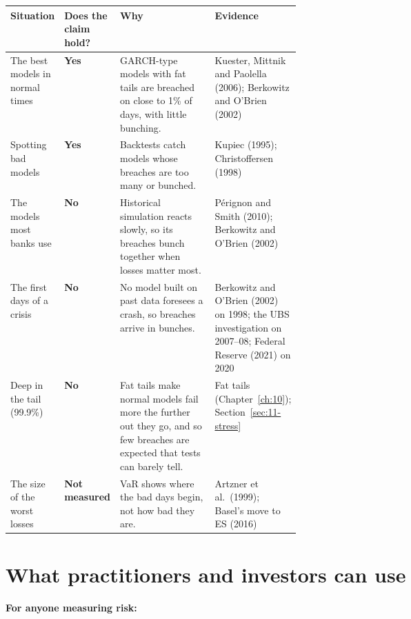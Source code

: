 \begin{center}
\small
\begin{tabularx}{\linewidth}{@{}>{\raggedright\arraybackslash}p{0.17\linewidth}>{\raggedright\arraybackslash}p{0.10\linewidth}>{\raggedright\arraybackslash}X>{\raggedright\arraybackslash}p{0.22\linewidth}@{}}
\toprule
Situation & Does the claim hold? & Why & Evidence \\
\midrule
The best models in normal times & \textbf{Yes} & GARCH-type models with fat tails are breached on close to 1\% of days, with little bunching. & Kuester, Mittnik and Paolella (2006); Berkowitz and O'Brien (2002) \\
Spotting bad models & \textbf{Yes} & Backtests catch models whose breaches are too many or bunched. & Kupiec (1995); Christoffersen (1998) \\
The models most banks use & \textbf{No} & Historical simulation reacts slowly, so its breaches bunch together when losses matter most. & P\'erignon and Smith (2010); Berkowitz and O'Brien (2002) \\
The first days of a crisis & \textbf{No} & No model built on past data foresees a crash, so breaches arrive in bunches. & Berkowitz and O'Brien (2002) on 1998; the UBS investigation on 2007--08; Federal Reserve (2021) on 2020 \\
Deep in the tail (99.9\%) & \textbf{No} & Fat tails make normal models fail more the further out they go, and so few breaches are expected that tests can barely tell. & Fat tails (Chapter~\ref{ch:10}); Section~\ref{sec:11-stress} \\
The size of the worst losses & \textbf{Not measured} & VaR\index{Value at Risk (VaR)!backtesting} shows where the bad days begin, not how bad they are. & Artzner et al.\ (1999); Basel's move to ES (2016) \\
\bottomrule
\end{tabularx}
\end{center}






\section{What practitioners and investors can use}
\label{sec:11-investors}

\textbf{For anyone measuring risk:}

